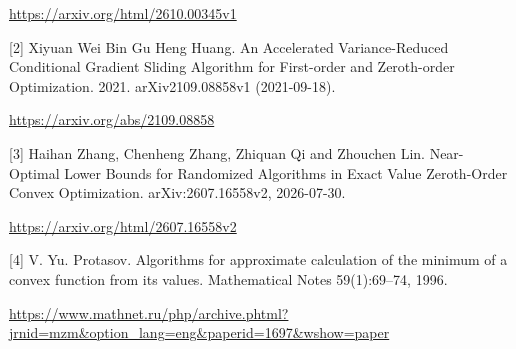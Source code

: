 \documentclass[10pt,a4paper]{article}
\begin{document}
\url{https://arxiv.org/html/2610.00345v1}

[2] Xiyuan Wei
Bin Gu
Heng Huang. An Accelerated Variance-Reduced Conditional Gradient Sliding Algorithm for First-order and Zeroth-order Optimization. 2021. arXiv2109.08858v1 (2021-09-18).

\url{https://arxiv.org/abs/2109.08858}

[3] Haihan Zhang, Chenheng Zhang, Zhiquan Qi and Zhouchen Lin. Near-Optimal Lower Bounds for Randomized Algorithms in Exact Value Zeroth-Order Convex Optimization. arXiv:2607.16558v2, 2026-07-30.

\url{https://arxiv.org/html/2607.16558v2}

[4] V. Yu. Protasov. Algorithms for approximate calculation of the minimum of a convex function from its values. Mathematical Notes 59(1):69--74, 1996.

\url{https://www.mathnet.ru/php/archive.phtml?jrnid=mzm&option_lang=eng&paperid=1697&wshow=paper}
\end{document}
